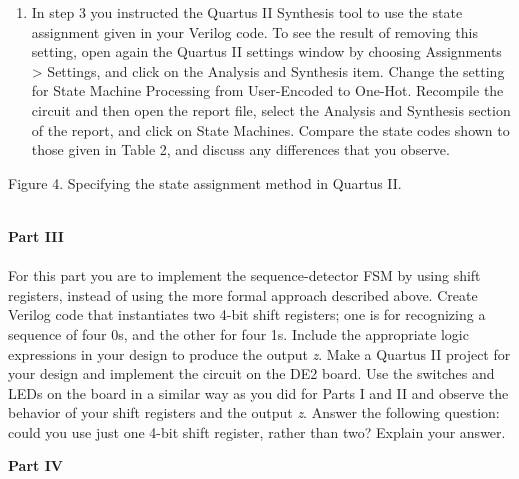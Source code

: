 \documentclass[epsfig,10pt,fullpage]{article}
\begin{document}
\begin{enumerate}
\item In step 3 you instructed the Quartus II Synthesis tool to use the state
assignment given in your Verilog code. To see the result of removing this setting, open
again the Quartus II settings window by choosing {\sf Assignments > Settings}, and 
click on the {\sf Analysis and Synthesis} item. Change the setting for  
{\sf State Machine Processing} from {\sf User-Encoded} to {\sf One-Hot}. Recompile the
circuit and then open the report file, select the {\sf Analysis
and Synthesis} section of the report, and click on {\sf State Machines}.
Compare the state codes shown to those given in Table 2, and
discuss any differences that you observe.
\end{enumerate}

\begin{figure}[H]
\scriptsize
\centerline{
\hbox{}}
\end{figure}
\centerline{Figure 4.  Specifying the state assignment method in Quartus II.}
~\\
\noindent
{\bf Part III}
~\\
~\\
\noindent
For this part you are to implement the sequence-detector FSM by using shift registers,
instead of using the more formal approach described above. Create Verilog code that
instantiates two 4-bit shift registers; one is for recognizing a sequence of four 0s, and
the other for four 1s. Include the appropriate logic expressions in your design
to produce the output {\it z}. Make a Quartus II project for your design and implement
the circuit on the DE2 board. Use the switches and LEDs on the board in a similar way as
you did for Parts I and II and observe the behavior of your shift registers and the
output {\it z}. Answer the following question: could you use just one 4-bit shift
register, rather than two? Explain your answer.

\newpage
\noindent
{\bf Part IV}
\end{document}
